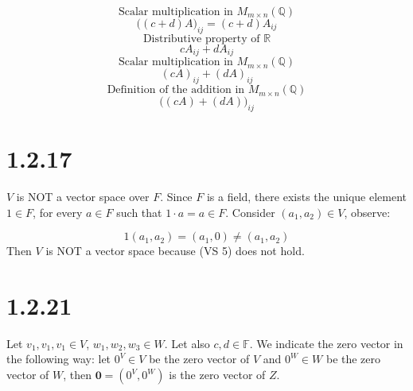 \documentclass{article}
\begin{document}
\begin{equation*}
    \text{Scalar multiplication in \(M_{m \times n}(\mathbb{Q})\)}
\end{equation*}
\begin{equation*}
    \Big((c + d)A\Big)_{ij} = (c+d)A_{ij}
\end{equation*}
\begin{equation*}
    \text{Distributive property of \(\mathbb{R}\)}
\end{equation*}
\begin{equation*}
    cA_{ij} + dA_{ij}
\end{equation*}
\begin{equation*}
    \text{Scalar multiplication in \(M_{m \times n}(\mathbb{Q})\)}
\end{equation*}
\begin{equation*}
    (cA)_{ij} + (dA)_{ij}
\end{equation*}
\begin{equation*}
    \text{Definition of the addition in \(M_{m \times n}(\mathbb{Q})\)}
\end{equation*}
\begin{equation*}
    \Big((cA) + (dA)\Big)_{ij}
\end{equation*}

\section*{1.2.17}

\(V\) is NOT a vector space over \(F\). Since \(F\) is a field, there exists the unique element \(1 \in F\), for every \(a \in F\) such
that \(1 \cdot a = a \in F\). Consider \((a_{1}, a_{2}) \in V\), observe:

\begin{equation*}
    1(a_{1}, a_{2}) = (a_{1}, 0) \neq (a_{1}, a_{2})
\end{equation*}
Then \(V\) is NOT a vector space because (VS 5) does not hold.

\section*{1.2.21}

Let \(v_{1}, v_{1}, v_{1} \in V\), \(w_{1}, w_{2}, w_{3} \in W\). Let also \(c, d \in \mathbb{F}\). We indicate the zero vector in the following
way: let \(0^{V} \in V\) be the zero vector of \(V\) and  \(0^{W} \in W\) be the zero vector of \(W\), then \(\boldsymbol{0} = (0^{V}, 0^{W})\) is
the zero vector of \(Z\).
\end{document}
